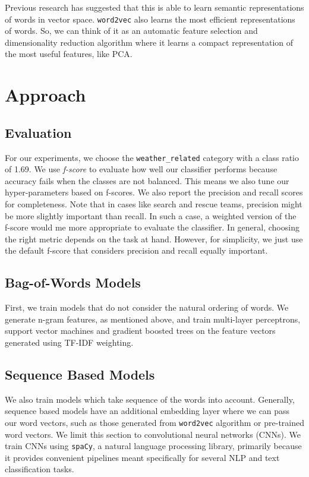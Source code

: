 \documentclass{article}
\begin{document}
Previous research has suggested that this is able to learn semantic representations of words in vector space. \texttt{word2vec} also learns the most efficient representations of words. So, we can think of it as an automatic feature selection and dimensionality reduction algorithm where it learns a compact representation of the most useful features, like PCA.

\section{Approach}

\subsection{Evaluation}
For our experiments, we choose the \texttt{weather\_related} category with a class ratio of 1.69. We use \textit{f-score} to evaluate how well our classifier performs because accuracy fails when the classes are not balanced. This means we also tune our hyper-parameters based on f-scores. We also report the precision and recall scores for completeness. Note that in cases like search and rescue teams, precision might be more slightly important than recall. In such a case, a weighted version of the f-score would me more appropriate to evaluate the classifier. In general, choosing the right metric depends on the task at hand. However, for simplicity, we just use the default f-score that considers precision and recall equally important.

\subsection{Bag-of-Words Models}
First, we train models that do not consider the natural ordering of words. We generate n-gram features, as mentioned above, and train multi-layer perceptrons, support vector machines and gradient boosted trees on the feature vectors generated using TF-IDF weighting.

\subsection{Sequence Based Models}
We also train models which take sequence of the words into account. Generally, sequence based models have an additional embedding layer where we can pass our word vectors, such as those generated from \texttt{word2vec} algorithm or pre-trained word vectors. We limit this section to convolutional neural networks (CNNs). We train CNNs using \texttt{spaCy}, a natural language processing library, primarily because it provides convenient pipelines meant specifically for several NLP and text classification tasks.
\end{document}
